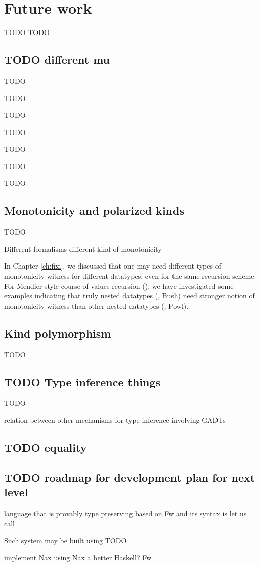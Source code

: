 \chapter{Future work}\label{ch:futwork} TODO
TODO


\section{TODO different mu}\label{sec:futwork:mu}
TODO

TODO

TODO

TODO

TODO

TODO

TODO





\section{Monotonicity and polarized kinds}
TODO



Different formalisms different kind of monotonicity

In Chapter \ref{ch:fixi}, we discussed that one may need
different types of monotonicity witness for different datatypes,
even for the same recursion scheme.
For Mendler-style course-of-values recursion (\McvPr),
we have investigated some examples indicating that
truly nested datatypes (\eg, Bush) need stronger notion of
monotonicity witness than other nested datatypes (\eg, Powl).


\section{Kind polymorphism}\label{sec:futwork:kindpoly}
TODO

\section{TODO Type inference things}
TODO

relation between other mechanisms for type inference involving GADTs

\section{TODO equality}

\section{TODO roadmap for development plan for next level}

language that is provably type preserving
based on Fw and its syntax is 
let us call

Such system may be built using TODO


implement Nax using Nax
a better Haskell?
Fw
